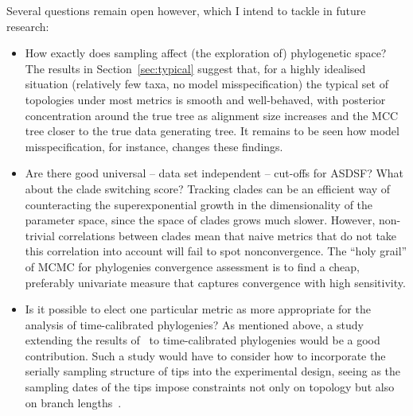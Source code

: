 Several questions remain open however, which I intend to tackle in future research:

\begin{itemize}
 \item How exactly does sampling affect (the exploration of) phylogenetic space?
 The results in Section~\ref{sec:typical} suggest that, for a highly idealised situation (relatively few taxa, no model misspecification) the typical set of topologies under most metrics is smooth and well-behaved, with posterior concentration around the true tree as alignment size increases and the MCC tree closer to the true data generating tree.
 It remains to be seen how model misspecification, for instance, changes these findings.
 \item Are there good universal  -- data set independent -- cut-offs for ASDSF? What about the clade switching score?
 Tracking clades can be an efficient way of counteracting the superexponential growth in the dimensionality of the parameter space, since the space of clades grows much slower.
 However, non-trivial correlations between clades mean that naive metrics that do not take this correlation into account will fail to spot nonconvergence.
 The ``holy grail'' of  MCMC for phylogenies convergence assessment is to find a cheap, preferably univariate measure that captures convergence with high sensitivity.
 \item Is it possible to elect one particular metric as more appropriate for the analysis of time-calibrated phylogenies?
 As mentioned above, a study extending the results of~\citep{Kuhner2014} to time-calibrated phylogenies would be a good contribution.
 Such a study would have to consider how to incorporate the serially sampling structure of tips into the experimental design, seeing as the sampling dates of the tips impose constraints not only on topology but also on branch lengths~\citep{Moller2018}.
\end{itemize}

% 
